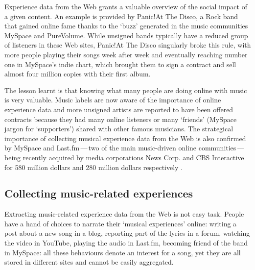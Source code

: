 Experience data from the Web grants a valuable overview of the social impact of a given content. %
An example is provided by
Panic!\;At The Disco, 
a Rock band that gained online fame thanks to the `buzz' generated in the music communities MySpace and PureVolume. 
While unsigned bands typically have a reduced group of listeners in these Web sites, Panic!\;At The Disco singularly broke this rule, with more people playing their songs week after week and eventually reaching number one in MySpace's indie chart, which brought them to sign a contract and sell almost four million copies with their first album.

The lesson learnt is that knowing what many people are doing online with music is very valuable. Music labels are now aware of the importance of online experience data and more unsigned artists are reported to have been offered contracts because they had many online listeners or many `friends' (MySpace jargon for `supporters') shared with other famous musicians.
The strategical importance of collecting musical experience data from the Web is also confirmed by MySpace and Last.fm\,---\,two of the main music-driven online communities\,---\,being recently acquired by media corporations News Corp. and CBS Interactive for 580 million dollars and 280 million dollars respectively \cite{News05,Cbs07}.



\subsection{Collecting music-related experiences} %
\label{sub:analysing_music_related_experiences}

Extracting music-related experience data from the Web is not easy task.
People have a hand of choices to narrate their `musical experiences' online: writing a post about a new song in a blog, reporting part of the lyrics in a forum, watching the video in YouTube, playing the audio in Last.fm, becoming friend of the band in MySpace: all these behaviours denote an interest for a song, yet they are all stored in different sites and cannot be easily aggregated. 

